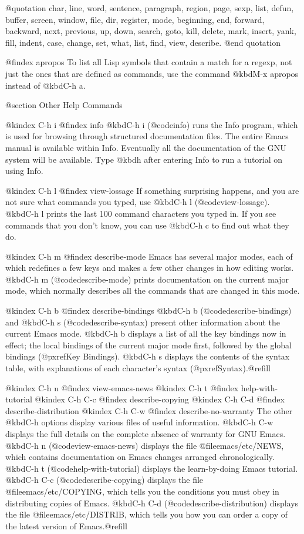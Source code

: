 {{{{{{@quotation
char, line, word, sentence, paragraph, region, page, sexp, list, defun,
buffer, screen, window, file, dir, register, mode,
beginning, end, forward, backward, next, previous, up, down, search, goto,
kill, delete, mark, insert, yank, fill, indent, case,
change, set, what, list, find, view, describe.
@end quotation

@findex apropos
  To list all Lisp symbols that contain a match for a regexp, not just
the ones that are defined as commands, use the command @kbd{M-x apropos}
instead of @kbd{C-h a}.

@section Other Help Commands

@kindex C-h i
@findex info
  @kbd{C-h i} (@code{info}) runs the Info program, which is used for
browsing through structured documentation files.  The entire Emacs manual
is available within Info.  Eventually all the documentation of the GNU
system will be available.  Type @kbd{h} after entering Info to run
a tutorial on using Info.

@kindex C-h l
@findex view-lossage
  If something surprising happens, and you are not sure what commands you
typed, use @kbd{C-h l} (@code{view-lossage}).  @kbd{C-h l} prints the last
100 command characters you typed in.  If you see commands that you don't
know, you can use @kbd{C-h c} to find out what they do.

@kindex C-h m
@findex describe-mode
  Emacs has several major modes, each of which redefines a few keys and
makes a few other changes in how editing works.  @kbd{C-h m} (@code{describe-mode})
prints documentation on the current major mode, which normally describes
all the commands that are changed in this mode.

@kindex C-h b
@findex describe-bindings
  @kbd{C-h b} (@code{describe-bindings}) and @kbd{C-h s}
(@code{describe-syntax}) present other information about the current
Emacs mode.  @kbd{C-h b} displays a list of all the key bindings now
in effect; the local bindings of the current major mode first,
followed by the global bindings (@pxref{Key Bindings}).  @kbd{C-h s}
displays the contents of the syntax table, with explanations of each
character's syntax (@pxref{Syntax}).@refill

@kindex C-h n
@findex view-emacs-news
@kindex C-h t
@findex help-with-tutorial
@kindex C-h C-c
@findex describe-copying
@kindex C-h C-d
@findex describe-distribution
@kindex C-h C-w
@findex describe-no-warranty
  The other @kbd{C-h} options display various files of useful information.
@kbd{C-h C-w} displays the full details on the complete absence of warranty
for GNU Emacs.  @kbd{C-h n} (@code{view-emacs-news}) displays the file
@file{emacs/etc/NEWS}, which contains documentation on Emacs changes
arranged chronologically.  @kbd{C-h t} (@code{help-with-tutorial}) displays
the learn-by-doing Emacs tutorial.  @kbd{C-h C-c} (@code{describe-copying})
displays the file @file{emacs/etc/COPYING}, which tells you the conditions
you must obey in distributing copies of Emacs.  @kbd{C-h C-d}
(@code{describe-distribution}) displays the file @file{emacs/etc/DISTRIB},
which tells you how you can order a copy of the latest version of
Emacs.@refill

}}}}}}
